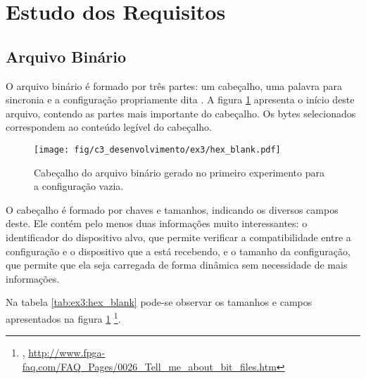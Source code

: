 \documentclass[11pt,a4paper,oneside]{book}
\begin{document}
\section{Estudo dos Requisitos}

\subsection{Arquivo Binário}
\label{sec:binario}
O arquivo binário é formado por três partes: um cabeçalho, uma palavra para sincronia e a configuração propriamente dita \cite{ug470, xapp583}.
A figura \ref{fig:ex3:hex_blank} apresenta o início deste arquivo, contendo as partes mais importante do cabeçalho.
Os bytes selecionados correspondem ao conteúdo legível do cabeçalho.

\begin{figure}[htp]
\centering
\texttt{[image: fig/c3\_desenvolvimento/ex3/hex\_blank.pdf]}
\caption{Cabeçalho do arquivo binário gerado no primeiro experimento para a configuração vazia.}
\label{fig:ex3:hex_blank}
\end{figure}

O cabeçalho é formado por chaves e tamanhos, indicando os diversos campos deste.
Ele contém pelo menos duas informações muito interessantes: o identificador do dispositivo alvo, que permite verificar a compatibilidade entre a configuração e o dispositivo que a está recebendo, e o tamanho da configuração, que permite que ela seja carregada de forma dinâmica sem necessidade de mais informações.

Na tabela \ref{tab:ex3:hex_blank} pode-se observar os tamanhos e campos apresentados na figura \ref{fig:ex3:hex_blank} \footnote{, \url{http://www.fpga-faq.com/FAQ_Pages/0026_Tell_me_about_bit_files.htm}}.
\end{document}
